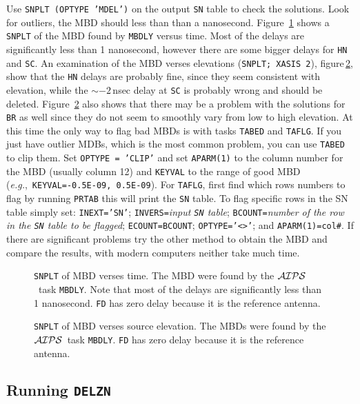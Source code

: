 \documentclass[preprint]{aastex}
\newcommand{\AIPS}{{$\cal AIPS\/$}}
\newcommand{\DELZN}{{\tt DELZN}}
\newcommand{\eg}{{\it e.g.},}
\begin{document}
Use {\tt SNPLT (OPTYPE 'MDEL')} on the output {\tt SN} table to check the
solutions.  Look for outliers, the MBD should less than than a nanosecond.
Figure~\ref{mbdlyvstim} shows a {\tt SNPLT} of the MBD found
by {\tt MBDLY} versus time.  Most of the delays are significantly less than 1 nanosecond, however there are
some bigger delays for {\tt HN} and {\tt SC}.  An examination of the MBD verses
elevations ({\tt SNPLT; XASIS 2}), figure\,\ref{mbdlyvselv},
show that the {\tt HN} delays are probably fine, since they seem consistent with elevation, while
the $\sim -2$\,nsec delay at {\tt SC} is
probably wrong and should be deleted. Figure~\ref{mbdlyvselv} also shows that there may be
a problem with
the solutions for {\tt BR} as well since they do not seem to smoothly vary from low to high
elevation.  At this time the only way to flag bad MBDs is with
tasks {\tt TABED} and {\tt TAFLG}.  If you just have outlier MDBs,
which is the most common problem, you can use {\tt TABED} to clip them.  Set
{\tt OPTYPE = 'CLIP'} and set {\tt APARM(1)} to the column number for the MBD (usually
column 12) and {\tt KEYVAL} to the range of good MBD (\eg\ {\tt KEYVAL=-0.5E-09,
0.5E-09}).
For {\tt TAFLG}, first find which rows numbers to flag by running {\tt PRTAB}
this will print the {\tt SN} table.  To flag specific rows in the SN table
simply set: {\tt INEXT='SN'}; {\tt INVERS=}{\it input {\tt SN} table};
{\tt BCOUNT=}{\it number of the row in the {\tt SN} table to be
flagged}; {\tt ECOUNT=BCOUNT}; {\tt OPTYPE='<>'}; and {\tt APARM(1)=col\#}.
If there are significant problems try the other
method to obtain the MBD and compare the results, with modern computers
neither take much time.

\begin{figure}[t!]
\caption{{\tt SNPLT} of MBD verses time.  The MBD were found
by the \AIPS\ task {\tt MBDLY}\@. Note that most of the delays are significantly less than
1 nanosecond.  {\tt FD} has zero delay because it is the reference antenna.}
\label{mbdlyvstim}
\end{figure}

\begin{figure}[t!]
\caption{{\tt SNPLT} of MBD verses source elevation.  The MBDs were found
by the \AIPS\ task {\tt MBDLY}\@. {\tt FD} has zero delay because it is the reference antenna.}
\label{mbdlyvselv}
\end{figure}

\subsection{Running \DELZN }
\end{document}
